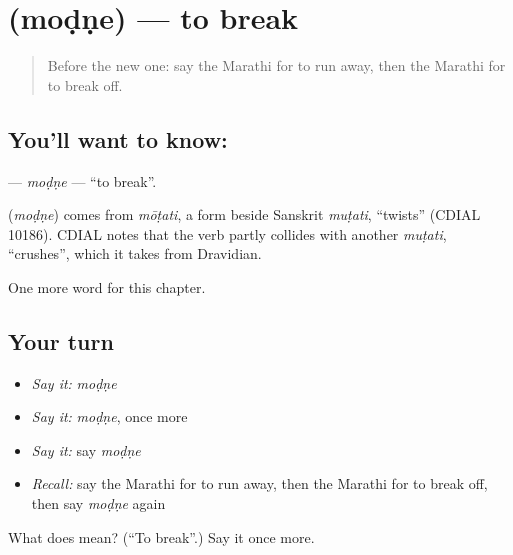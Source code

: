 \section[\texorpdfstring{\mr{मोडणे} (moḍṇe)}{मोडणे (moḍṇe)}]{ (moḍṇe) — to break}

\label{lesson:MR-C154-modne}



\begin{quote}
Before the new one: say the Marathi for to run away, then the Marathi for to break off.
\end{quote}

\subsection*{You'll want to know: }
\textbf{} — \emph{moḍṇe} — \textquotedblleft{}to break\textquotedblright{}.

\begin{cousinweb}
\textbf{} (\emph{moḍṇe}) comes from \emph{mōṭati}, a form beside Sanskrit \emph{muṭati}, \textquotedblleft{}twists\textquotedblright{} (CDIAL 10186). CDIAL notes that the verb partly collides with another \emph{muṭati}, \textquotedblleft{}crushes\textquotedblright{}, which it takes from Dravidian.
\end{cousinweb}

\begin{grammarlens}[title={What you've built}]
One more word for this chapter.
\end{grammarlens}

\subsection*{Your turn}
\begin{itemize}
\raggedright
  \item \emph{Say it:} \emph{moḍṇe}
  \item \emph{Say it:} \emph{moḍṇe}, once more
  \item \emph{Say it:} say \emph{moḍṇe}
  \item \emph{Recall:} say the Marathi for to run away, then the Marathi for to break off, then say \emph{moḍṇe} again
\end{itemize}

\begin{tcolorbox}[breakable,colback=teal!4,colframe=teal!35!black,title={Before you move on}]
What does  mean? (\textquotedblleft{}To break\textquotedblright{}.) Say it once more.
\end{tcolorbox}
